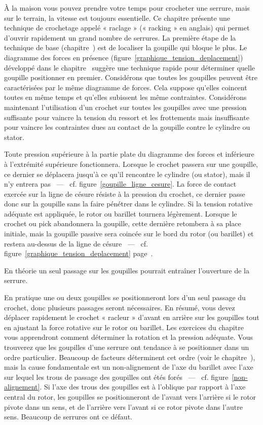 \documentclass[a4paper,french,11pt,twoside]{report}
\begin{document}
À la maison vous pouvez prendre votre temps pour crocheter une serrure, mais sur le terrain, la vitesse est toujours essentielle. Ce chapitre présente une technique de crochetage appelé « raclage » (« racking » en anglais) qui permet d'ouvrir rapidement un grand nombre de serrures. La première étape de la technique de base (chapitre~) est de localiser la goupille qui bloque le plus. Le diagramme des forces en présence (figure~\ref{graphique_tension_deplacement}) développé dans le chapitre~ suggère une technique rapide pour déterminer quelle goupille positionner en premier. Considérons que toutes les goupilles peuvent être caractérisées par le même diagramme de forces. Cela suppose qu'elles coincent toutes en même temps et qu'elles subissent les même contraintes. Considérons maintenant l'utilisation d'un crochet sur toutes les goupilles avec une pression suffisante pour vaincre la tension du ressort et les frottements mais insuffisante pour vaincre les contraintes dues au contact de la goupille contre le cylindre ou stator.

Toute pression supérieure à la partie plate du diagramme des forces et inférieure à l'extrémité supérieure fonctionnera. Lorsque le crochet passera sur une goupille, ce dernier se déplacera jusqu'à ce qu'il rencontre le cylindre (ou stator), mais il n'y entrera pas ~---~ cf. figure~\ref{goupille_ligne_cesure}. La force de contact exercée sur la ligne de césure résiste à la pression du crochet, ce dernier passe donc sur la goupille sans la faire pénétrer dans le cylindre. Si la tension rotative adéquate est appliquée, le rotor ou barillet tournera légèrement. Lorsque le crochet ou pick abandonnera la goupille, cette dernière retombera à sa place initiale, mais la goupille passive sera coincée sur le bord du rotor (ou barillet) et restera au-dessus de la ligne de césure ~---~ cf. figure~\ref{graphique_tension_deplacement} page~\pageref{graphique_tension_deplacement}.

En théorie un seul passage sur les goupilles pourrait entraîner l'ouverture de la serrure.

En pratique une ou deux goupilles se positionneront lors d'un seul passage du crochet, donc plusieurs passages seront nécessaires. En résumé, vous devez déplacer rapidement le crochet « racleur » d'avant en arrière sur les goupilles tout en ajustant la force rotative sur le rotor ou barillet. Les exercices du chapitre~ vous apprendront comment déterminer la rotation et la pression adéquate. Vous trouverez que les goupilles d'une serrure ont tendance à se positionner dans un ordre particulier. Beaucoup de facteurs déterminent cet ordre (voir le chapitre~), mais la cause fondamentale est un non-alignement de l'axe du barillet avec l'axe sur lequel les trous de passage des goupilles ont étés forés ~---~ cf. figure~\ref{non-alignement}. Si l'axe des trous des goupilles est à l'oblique par rapport à l'axe central du rotor, les goupilles se positionneront de l'avant vers l'arrière si le rotor pivote dans un sens, et de l'arrière vers l'avant si ce rotor pivote dans l'autre sens. Beaucoup de serrures ont ce défaut.
\end{document}
